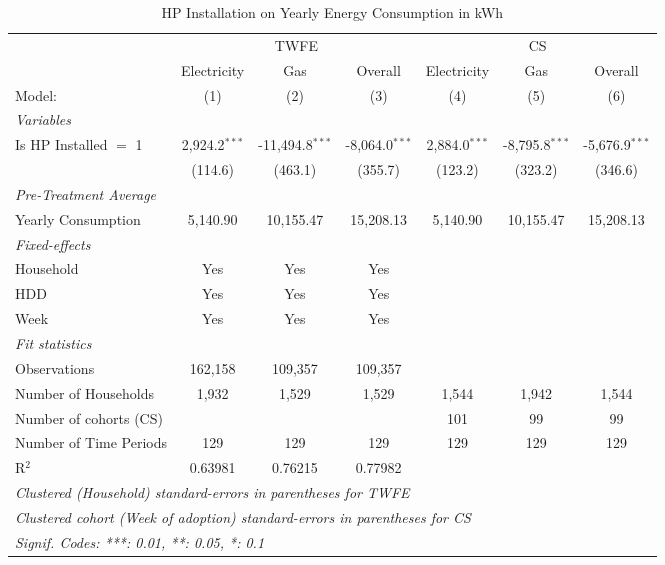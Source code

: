 
\begin{table}[htbp]
   \caption{\label{tab:hp-did-overall-conso-detailed} HP Installation on Yearly Energy Consumption in kWh}
   \centering
   \begin{tabular}{lcccccc}
      \tabularnewline \midrule \midrule
       & \multicolumn{3}{c}{TWFE} & \multicolumn{3}{c}{CS} \\ 
                                     & Electricity     & Gas               & Overall          & Electricity     & Gas               & Overall \\   
      Model:                         & (1)             & (2)               & (3)              & (4)             & (5)               & (6)\\  
      \midrule
      \emph{Variables}\\
      Is HP Installed $=$ 1           &  2,924.2$^{***}$  &  -11,494.8$^{***}$  &  -8,064.0$^{***}$  & 2,884.0$^{***}$ & -8,795.8$^{***}$ & -5,676.9$^{***}$ \\
                                      &  (114.6)          &  (463.1)            &  (355.7)           & (123.2) & (323.2) & (346.6) \\
      \midrule
\emph{Pre-Treatment Average}\\
      Yearly Consumption             & 5,140.90        & 10,155.47         & 15,208.13        & 5,140.90        & 10,155.47         & 15,208.13\\  
\midrule
      \emph{Fixed-effects}\\
      Household                       &  Yes              &  Yes                &  Yes               &  &  &  \\
      HDD                             &  Yes              &  Yes                &  Yes               &  &  &  \\
      Week                            &  Yes              &  Yes                &  Yes               &  &  &  \\
      \midrule
      \emph{Fit statistics}\\
      Observations                    &  162,158          &  109,357            &  109,357           &  &  &  \\
      Number of Households  &  1,932            &  1,529              &  1,529             & 1,544 & 1,942 & 1,544 \\
Number of cohorts (CS) & & & & 101 & 99 & 99 \\
      Number of Time Periods          &  129              &  129                &  129               & 129 & 129 & 129 \\
      R$^2$                           &  0.63981          &  0.76215            &  0.77982           &  &  &  \\
      \midrule \midrule
\multicolumn{10}{l}{\emph{Clustered (Household) standard-errors in parentheses for TWFE}}\\
\multicolumn{10}{l}{\emph{Clustered cohort (Week of adoption) standard-errors in parentheses for CS}}\\
      \multicolumn{7}{l}{\emph{Signif. Codes: ***: 0.01, **: 0.05, *: 0.1}}\\
   \end{tabular}
\end{table}


